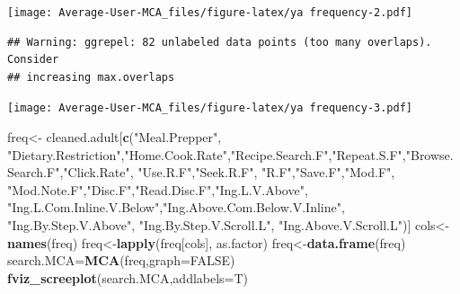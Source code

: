 \documentclass[
]{article}
\newenvironment{Shaded}{\begin{snugshade}}{\end{snugshade}}
\newcommand{\DataTypeTok}[1]{\textcolor[rgb]{0.13,0.29,0.53}{#1}}
\newcommand{\KeywordTok}[1]{\textcolor[rgb]{0.13,0.29,0.53}{\textbf{#1}}}
\newcommand{\NormalTok}[1]{#1}
\newcommand{\OtherTok}[1]{\textcolor[rgb]{0.56,0.35,0.01}{#1}}
\newcommand{\StringTok}[1]{\textcolor[rgb]{0.31,0.60,0.02}{#1}}
\begin{document}
\texttt{[image: Average-User-MCA\_files/figure-latex/ya frequency-2.pdf]}

\begin{Shaded}
\end{Shaded}

\begin{verbatim}
## Warning: ggrepel: 82 unlabeled data points (too many overlaps). Consider
## increasing max.overlaps
\end{verbatim}

\texttt{[image: Average-User-MCA\_files/figure-latex/ya frequency-3.pdf]}

\begin{Shaded}
\begin{Highlighting}[]
\NormalTok{freq<-}\StringTok{ }\NormalTok{cleaned.adult[}\KeywordTok{c}\NormalTok{(}\StringTok{"Meal.Prepper"}\NormalTok{, }\StringTok{"Dietary.Restriction"}\NormalTok{,}\StringTok{"Home.Cook.Rate"}\NormalTok{,}\StringTok{"Recipe.Search.F"}\NormalTok{,}\StringTok{"Repeat.S.F"}\NormalTok{,}\StringTok{"Browse.Search.F"}\NormalTok{,}\StringTok{"Click.Rate"}\NormalTok{,}
            \StringTok{"Use.R.F"}\NormalTok{,}\StringTok{"Seek.R.F"}\NormalTok{, }\StringTok{"R.F"}\NormalTok{,}\StringTok{"Save.F"}\NormalTok{,}\StringTok{"Mod.F"}\NormalTok{, }\StringTok{"Mod.Note.F"}\NormalTok{,}\StringTok{"Disc.F"}\NormalTok{,}\StringTok{"Read.Disc.F"}\NormalTok{,}\StringTok{"Ing.L.V.Above"}\NormalTok{,}
            \StringTok{"Ing.L.Com.Inline.V.Below"}\NormalTok{,}\StringTok{"Ing.Above.Com.Below.V.Inline"}\NormalTok{,  }\StringTok{"Ing.By.Step.V.Above"}\NormalTok{,  }\StringTok{"Ing.By.Step.V.Scroll.L"}\NormalTok{,}
            \StringTok{"Ing.Above.V.Scroll.L"}\NormalTok{)]}
\NormalTok{cols<-}\KeywordTok{names}\NormalTok{(freq)}
\NormalTok{freq<-}\KeywordTok{lapply}\NormalTok{(freq[cols], as.factor)}
\NormalTok{freq<-}\KeywordTok{data.frame}\NormalTok{(freq)}
\NormalTok{search.MCA=}\KeywordTok{MCA}\NormalTok{(freq,}\DataTypeTok{graph=}\OtherTok{FALSE}\NormalTok{)}
\KeywordTok{fviz_screeplot}\NormalTok{(search.MCA,}\DataTypeTok{addlabels=}\NormalTok{T)}
\end{Highlighting}
\end{Shaded}
\end{document}
